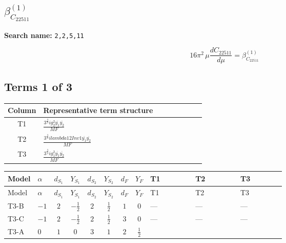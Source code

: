 \documentclass[8pt]{article}
\begin{document}
\begin{landscape}
\section*{$\beta_{C_{22511}}^{(1)}$}
\noindent\textbf{Search name: }\texttt{2,2,5,11}\par\smallskip
\[16\pi^2\,\mu\frac{d C_{22511}}{d\mu}=\beta_{C_{22511}}^{(1)}\]
\subsection*{Terms 1 of 3}
\begin{center}
\begin{tabular}{@{}c >{\raggedright\arraybackslash}p{0.82\linewidth}@{}}
\toprule
Column & Representative term structure \\
\midrule
T1 & \(\displaystyle \frac{3^{\frac{3}{4}} i g_{2}^{2} \overline{y_{1}} \overline{y_{2}}}{MF}\) \\
\midrule
T2 & \(\displaystyle \frac{3^{\frac{3}{4}} i lambda12Inv1 \overline{y_{1}} \overline{y_{2}}}{MF}\) \\
\midrule
T3 & \(\displaystyle \frac{3^{\frac{3}{4}} i g_{1}^{2} \overline{y_{1}} \overline{y_{2}}}{MF}\) \\
\midrule
\bottomrule
\end{tabular}
\end{center}
\smallskip
\tiny
\begin{longtable}{@{}llcccccc >{\raggedright\arraybackslash}p{0.21\linewidth} >{\raggedright\arraybackslash}p{0.21\linewidth} >{\raggedright\arraybackslash}p{0.21\linewidth}@{}}
\toprule
Model & $\alpha$ & $d_{S_1}$ & $Y_{S_1}$ & $d_{S_2}$ & $Y_{S_2}$ & $d_F$ & $Y_F$ & T1 & T2 & T3 \\
\midrule
\endfirsthead
\toprule
Model & $\alpha$ & $d_{S_1}$ & $Y_{S_1}$ & $d_{S_2}$ & $Y_{S_2}$ & $d_F$ & $Y_F$ & T1 & T2 & T3 \\
\midrule
\endhead
T3-B & $-1$ & $2$ & $-\frac{1}{2}$ & $2$ & $\frac{1}{2}$ & $1$ & $0$ & --- & --- & --- \\
\midrule
T3-C & $-1$ & $2$ & $-\frac{1}{2}$ & $2$ & $\frac{1}{2}$ & $3$ & $0$ & --- & --- & --- \\
\midrule
T3-A & $0$ & $1$ & $0$ & $3$ & $1$ & $2$ & $\frac{1}{2}$ & \scriptsize\adjustbox{max width=\linewidth}{$\begin{gathered} - \frac{11 \cdot 3^{\frac{3}{4}} i g_{2}^{2} \overline{y_{1}} \overline{y_{2}}}{8 MF}\end{gathered}$} & \scriptsize\adjustbox{max width=\linewidth}{$\begin{gathered} - \frac{3^{\frac{3}{4}} i lambda12Inv1 \overline{y_{1}} \overline{y_{2}}}{6 MF}\end{gathered}$} & \scriptsize\adjustbox{max width=\linewidth}{$\begin{gathered} - \frac{3^{\frac{3}{4}} i g_{1}^{2} \overline{y_{1}} \overline{y_{2}}}{8 MF}\end{gathered}$} \\

\end{longtable}
\end{landscape}
\end{document}
